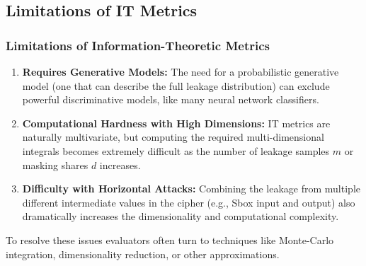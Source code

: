 \subsection{Limitations of IT Metrics}

\begin{frame}
    \frametitle{Limitations of Information-Theoretic Metrics}
    
    \begin{enumerate}
        \item \textbf{Requires Generative Models:}
        The need for a probabilistic generative model (one that can describe the full leakage distribution) can exclude powerful discriminative models, like many neural network classifiers.
        
        \vspace{0.3cm}
        
        \item \textbf{Computational Hardness with High Dimensions:}
        IT metrics are naturally multivariate, but computing the required multi-dimensional integrals becomes extremely difficult as the number of leakage samples $m$ or masking shares $d$ increases.
        
        \vspace{0.3cm}
        
        \item \textbf{Difficulty with Horizontal Attacks:}
        Combining the leakage from multiple different intermediate values in the cipher (e.g., Sbox input and output) also dramatically increases the dimensionality and computational complexity.
    \end{enumerate}
    
    
        To resolve these issues evaluators often turn to techniques like Monte-Carlo integration, dimensionality reduction, or other approximations.
\end{frame}
